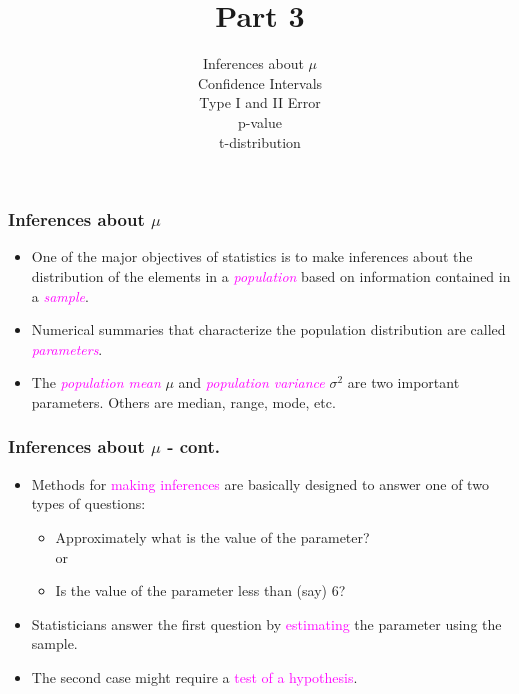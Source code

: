 \documentclass[xcolor=dvipsnames,12pt]{beamer}
\title[]{Part 3}
\author[Stat 801]{Inferences about {\boldmath$\mu$}\\
Confidence Intervals\\
Type I and II Error \\
p-value\\
t-distribution}
\date{}
\begin{document}
\begin{frame}[plain]
  \titlepage
\end{frame}




\begin{frame}
\frametitle{Inferences about {\boldmath$\mu$}}
\begin{itemize}
\item One of the major objectives of statistics is to make inferences
about the distribution of the elements in a  \textcolor{magenta}{\textit{population}} based
on information contained in a  \textcolor{magenta}{\textit{sample}}.
\item Numerical summaries that characterize the population
distribution are called  \textcolor{magenta}{\textit{parameters}}.  
\item The  \textcolor{magenta}{\textit{population mean}} $\mu$ and \textcolor{magenta}{\textit{population variance}} $\sigma^2$ are two important
parameters.  Others are median, range, mode, etc.
\end{itemize}
\end{frame}

\begin{frame}
\frametitle{Inferences about {\boldmath$\mu$} - cont.}
\begin{itemize}
\item Methods for \textcolor{magenta}{making inferences} are basically designed to
answer one of two types of questions:
\begin{itemize}
\item  Approximately what is the value of the parameter?\\
or
\item Is the value of the parameter less than (say) 6?
\end{itemize}
\item Statisticians answer the first  question by \textcolor{magenta}{estimating}
the parameter using the sample. 
\item The second case might require  a   \textcolor{magenta}{test of a hypothesis}.
\end{itemize}
\end{frame}
\end{document}
